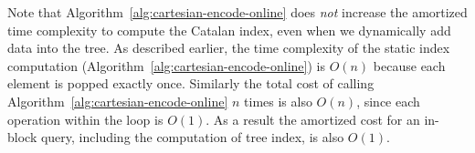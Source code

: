 Note that Algorithm~\ref{alg:cartesian-encode-online} does {\em not}
increase the amortized time complexity to compute the Catalan index,
even when we dynamically add data into the tree.  As described
earlier, the time complexity of the static index computation
(Algorithm~\ref{alg:cartesian-encode-online}) is $O(n)$ because each
element is popped exactly once.  Similarly the total cost of calling
Algorithm~\ref{alg:cartesian-encode-online} $n$ times is also $O(n)$,
since each operation within the loop is $O(1)$.  As a result the
amortized cost for an in-block query, including the computation of
tree index, is also $O(1)$.